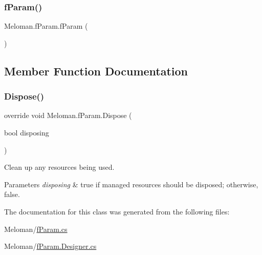 \subsubsection{\texorpdfstring{fParam()}{fParam()}}
{\footnotesize\ttfamily Meloman.\+f\+Param.\+f\+Param (\begin{DoxyParamCaption}{ }\end{DoxyParamCaption})}



\subsection{Member Function Documentation}
\mbox{\label{class_meloman_1_1f_param_a089ac345d549519da582757365b99fef}} 
\subsubsection{\texorpdfstring{Dispose()}{Dispose()}}
{\footnotesize\ttfamily override void Meloman.\+f\+Param.\+Dispose (\begin{DoxyParamCaption}\item[{bool}]{disposing }\end{DoxyParamCaption})\hspace{0.3cm}{\ttfamily [protected]}}



Clean up any resources being used. 


\begin{DoxyParams}{Parameters}
{\em disposing} & true if managed resources should be disposed; otherwise, false.\\
\hline
\end{DoxyParams}


The documentation for this class was generated from the following files\+:\begin{DoxyCompactItemize}
\item 
Meloman/\mbox{\hyperlink{f_param_8cs}{f\+Param.\+cs}}\item 
Meloman/\mbox{\hyperlink{f_param_8_designer_8cs}{f\+Param.\+Designer.\+cs}}\end{DoxyCompactItemize}
